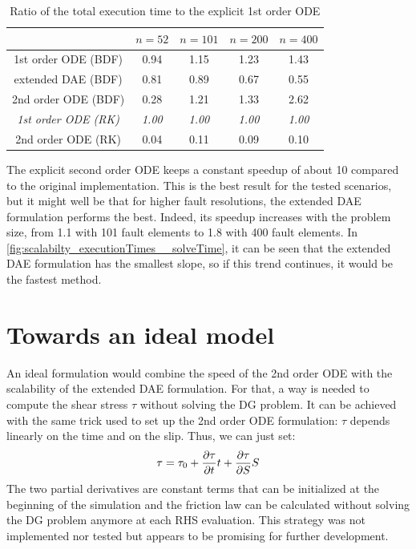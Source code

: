 \begin{table}[H]
	\centering 
	\begin{tabular}{ | c | c c c c |}
		\hline	
									 & $n=52$	& $n=101$ 	& $n=200$ 	& $n=400$\\ \hline
		1st order ODE (BDF)			 & 0.94 		& 1.15		& 1.23		& 1.43 	 \\  
		extended DAE  (BDF) 		 & 0.81 		& 0.89 		& 0.67		& 0.55   \\
		2nd order ODE (BDF)          & 0.28 		& 1.21 		& 1.33		& 2.62   \\
		\textit{1st order ODE (RK)}  & \textit{1.00} 		& \textit{1.00}		& \textit{1.00}		& \textit{1.00}   \\  
		2nd order ODE (RK) 			 & 0.04 		& 0.11 		& 0.09		& 0.10   \\ \hline
	\end{tabular}
	\caption{Ratio of the total execution time to the explicit 1st order ODE}
	\label{tab:Speedup_Scalability}
\end{table}

The explicit second order ODE keeps a constant speedup of about 10 compared to the original implementation. This is the best result for the tested scenarios, but it might well be that for higher fault resolutions, the extended DAE formulation performs the best. Indeed, its speedup increases with the problem size, from 1.1 with 101 fault elements to 1.8 with 400 fault elements. In \autoref{fig:scalabilty_executionTimes__solveTime}, it can be seen that the extended DAE formulation has the smallest slope, so if this trend continues, it would be the fastest method.


\section{Towards an ideal model}
\label{sec:Results_towardsAnIdealModel}
An ideal formulation would combine the speed of the 2nd order ODE with the scalability of the extended DAE formulation. For that, a way is needed to compute the shear stress $\tau$ without solving the DG problem. It can be achieved with the same trick used to set up the 2nd order ODE formulation: $\tau$ depends linearly on the time and on the slip. Thus, we can just set: 
\begin{equation}
	\tau = \tau_0 + \pdv{\tau}{t}t + \pdv{\tau}{S}S
\end{equation}
The two partial derivatives are constant terms that can be initialized at the beginning of the simulation and the friction law can be calculated without solving the DG problem anymore at each RHS evaluation. This strategy was not implemented nor tested but appears to be promising for further development.

